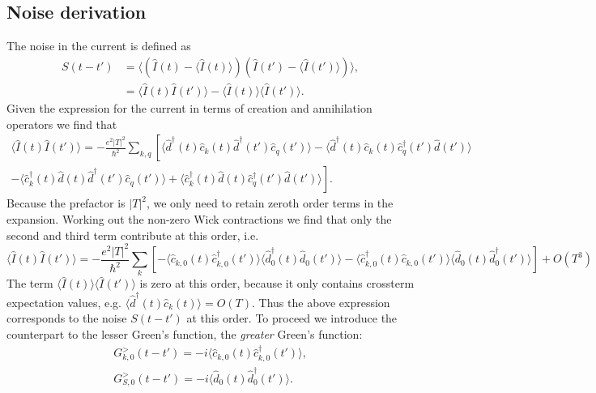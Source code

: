 \subsection{Noise derivation}
The noise in the current is defined as
\begin{align}
    S(t-t') &= \langle (\hat{I}(t) - \langle \hat{I}(t)\rangle)(\hat{I}(t') - \langle \hat{I}(t')\rangle) \rangle,  \nonumber\\
    &= \langle \hat{I}(t)\hat{I}(t') \rangle - \langle \hat{I}(t)\rangle \langle \hat{I}(t') \rangle.
\end{align}
Given the expression for the current in terms of creation and annihilation operators we find that
\begin{align}
    \langle\hat{I}(t)\hat{I}(t')\rangle = -\frac{e^2 |T|^2}{\hbar^2}\sum_{k,q} \left[
    \langle\hat{d}^\dagger(t)\hat{c}_k(t)\hat{d}^\dagger(t')\hat{c}_q(t')\rangle - 
    \langle\hat{d}^\dagger(t)\hat{c}_k(t)\hat{c}_q^\dagger(t')\hat{d}(t')\rangle \right.\nonumber\\
    \left.- \langle\hat{c}_k^\dagger(t)\hat{d}(t)\hat{d}^\dagger(t')\hat{c}_q(t')\rangle +
    \langle\hat{c}_k^\dagger(t)\hat{d}(t)\hat{c}_q^\dagger(t')\hat{d}(t')\rangle \right].
\end{align}
Because the prefactor is $|T|^2$, we only need to retain zeroth order terms in the expansion. Working out the non-zero Wick contractions we find that only the second and third term contribute at this order, i.e.
\begin{equation}
    \langle\hat{I}(t)\hat{I}(t')\rangle = -\frac{e^2 |T|^2}{\hbar^2}\sum_k\left[
        -\langle\hat{c}_{k,0}(t)\hat{c}^\dagger_{k,0}(t')\rangle
        \langle\hat{d}^\dagger_0(t)\hat{d}_0(t')\rangle
        -\langle \hat{c}_{k,0}^\dagger(t)\hat{c}_{k,0}(t') \rangle \langle \hat{d}_0(t)\hat{d}_0^\dagger(t') \rangle
    \right] + O(T^3)
\end{equation}
The term $\langle \hat{I}(t)\rangle \langle \hat{I}(t') \rangle$ is zero at this order, because it only contains crossterm expectation values, e.g. $\langle \hat{d}^\dagger(t)\hat{c}_k(t)\rangle = O(T)$. Thus the above expression corresponds to the noise $S(t-t')$ at this order. To proceed we introduce the counterpart to the lesser Green's function, the \textit{greater} Green's function:
\begin{align}
    G_{k,0}^>(t-t') = -i\langle \hat{c}_{k,0}(t)\hat{c}_{k,0}^\dagger(t') \rangle, \\
    G_{S,0}^>(t-t') = -i\langle \hat{d}_0(t)\hat{d}_0^\dagger(t') \rangle.
\end{align}
